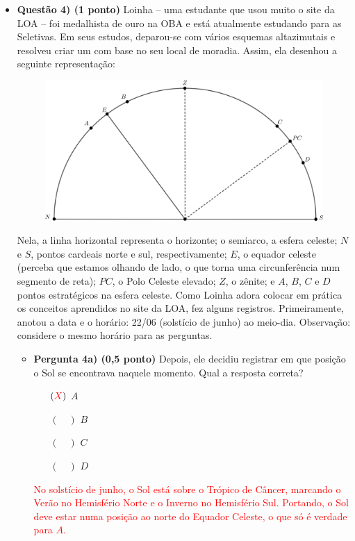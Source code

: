 \documentclass[a4paper, 12pt]{article}
\begin{document}
\begin{flushleft}
\begin{itemize}
		\item \textbf{Questão 4) (1 ponto)} Loinha -- uma estudante que usou muito o site da LOA -- foi medalhista de ouro na OBA e está atualmente estudando para as Seletivas. Em seus estudos, deparou-se com vários esquemas altazimutais e resolveu criar um com base no seu local de moradia. Assim, ela desenhou a seguinte representação:
			\begin{figure}[H]
				\centering
				\includegraphics[scale=1.2]{./img/4.png}
			\end{figure}
			Nela, a linha horizontal representa o horizonte; o semiarco, a esfera celeste; $N$ e $S$, pontos cardeais norte e sul, respectivamente; $E$, o equador celeste (perceba que estamos olhando de lado, o que torna uma circunferência num segmento de reta); $PC$, o Polo Celeste elevado; $Z$, o zênite; e $A$, $B$, $C$ e $D$ pontos estratégicos na esfera celeste. \linebreak
			Como Loinha adora colocar em prática os conceitos aprendidos no site da LOA, fez alguns registros. Primeiramente, anotou a data e o horário: 22/06 (solstício de junho) ao meio-dia.\linebreak
			Observação: considere o mesmo horário para as perguntas.
			\begin{itemize}
				\item \textbf{Pergunta 4a) (0,5 ponto)} Depois, ele decidiu registrar em que posição o Sol se encontrava naquele momento. Qual a resposta correta?
					\begin{itemize}
						\item[$(\textcolor{red}{X})$] $A$
						\item[$(\quad)$] $B$
						\item[$(\quad)$] $C$
						\item[$(\quad)$] $D$
					\end{itemize}
					\textcolor{red}{No solstício de junho, o Sol está sobre o Trópico de Câncer, marcando o Verão no Hemisfério Norte e o Inverno no Hemisfério Sul. Portando, o Sol deve estar numa posição ao norte do Equador Celeste, o que só é verdade para $A$.}
					

\end{itemize}
\end{itemize}
\end{flushleft}
\end{document}
